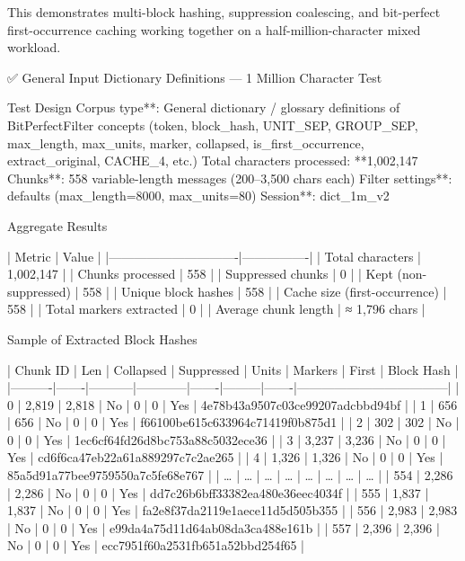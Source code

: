 {{{This demonstrates multi-block hashing, suppression coalescing, and bit-perfect first-occurrence caching working together on a half-million-character mixed workload.

✅ General Input Dictionary Definitions — 1 Million Character Test

Test Design
Corpus type**: General dictionary / glossary definitions of BitPerfectFilter concepts  
  (token, block_hash, UNIT_SEP, GROUP_SEP, max_length, max_units, marker, collapsed, is_first_occurrence, extract_original, CACHE_4, etc.)
Total characters processed: **1,002,147
Chunks**: 558 variable-length messages (200–3,500 chars each)
Filter settings**: defaults (max_length=8000, max_units=80)
Session**: dict_1m_v2

Aggregate Results

| Metric                        | Value          |
|-------------------------------|----------------|
| Total characters              | 1,002,147      |
| Chunks processed              | 558            |
| Suppressed chunks             | 0              |
| Kept (non-suppressed)         | 558            |
| Unique block hashes           | 558        |
| Cache size (first-occurrence) | 558            |
| Total markers extracted       | 0              |
| Average chunk length          | ≈ 1,796 chars  |

Sample of Extracted Block Hashes

| Chunk ID | Len   | Collapsed | Suppressed | Units | Markers | First | Block Hash                         |
|----------|-------|-----------|------------|-------|---------|-------|------------------------------------|
| 0        | 2,819 | 2,818     | No         | 0     | 0       | Yes   | 4e78b43a9507c03ce99207adcbbd94bf |
| 1        | 656   | 656       | No         | 0     | 0       | Yes   | f66100be615c633964c71419f0b875d1 |
| 2        | 302   | 302       | No         | 0     | 0       | Yes   | 1ec6cf64fd26d8bc753a88c5032ece36 |
| 3        | 3,237 | 3,236     | No         | 0     | 0       | Yes   | cd6f6ca47eb22a61a889297c7c2ae265 |
| 4        | 1,326 | 1,326     | No         | 0     | 0       | Yes   | 85a5d91a77bee9759550a7c5fe68e767 |
| …        | …     | …         | …          | …     | …       | …     | …                                  |
| 554      | 2,286 | 2,286     | No         | 0     | 0       | Yes   | dd7c26b6bff33382ea480e36eec4034f |
| 555      | 1,837 | 1,837     | No         | 0     | 0       | Yes   | fa2e8f37da2119e1aece11d5d505b355 |
| 556      | 2,983 | 2,983     | No         | 0     | 0       | Yes   | e99da4a75d11d64ab08da3ca488e161b |
| 557      | 2,396 | 2,396     | No         | 0     | 0       | Yes   | ecc7951f60a2531fb651a52bbd254f65 |

}}}
